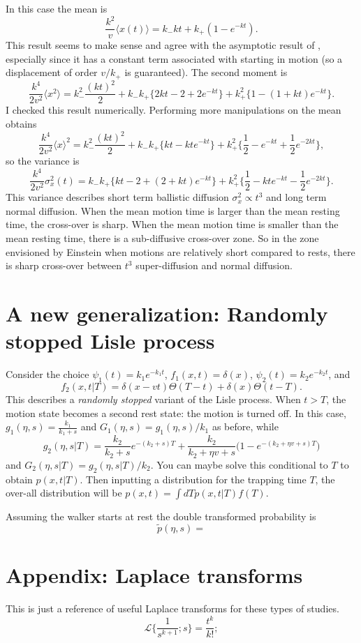\documentclass[11pt]{article}
\newcommand\be{\begin{equation}} %
\newcommand\ee{\end{equation}}   %
\newcommand\bra{\langle}
\newcommand\ket{\rangle}
\newcommand\El{\mathcal{L}}
\begin{document}
In this case the mean is
\be  \frac{k^2}{v}\bra x(t) \ket = k_- kt + k_+(1-e^{-kt}).\ee
This result seems to make sense and agree with the asymptotic result of \citet{Lisle1998}, especially since it has a constant term associated with starting in motion (so a displacement of order $v/k_+$ is guaranteed).
The second moment is
\be
\frac{k^4}{2v^2}\bra x^2 \ket = k_-^2\frac{(kt)^2}{2} + k_-k_+\{2kt -2 + 2e^{-kt}\} + k_+^2\{1-(1+kt)e^{-kt}\}.
\ee
I checked this result numerically.
Performing more manipulations on the mean obtains
\be\frac{k^4}{2v^2} \bra x\ket^2 = k_-^2 \frac{(kt)^2}{2} + k_-k_+\{kt - kte^{-kt}\} +  k_+^2\{\frac{1}{2} - e^{-kt} + \frac{1}{2}e^{-2kt}\}   ,\ee
so the variance is
\be \frac{k^4}{2v^2} \sigma_x^2(t) = k_- k_+ \{kt -2 + (2 + kt)e^{-kt}\} + k_+^2\{\frac{1}{2} -kt e^{-kt} - \frac{1}{2}e^{-2kt}\}.\ee
This variance describes short term ballistic diffusion $\sigma_x^2 \propto t^3$ and long term normal diffusion.
When the mean motion time is larger than the mean resting time, the cross-over is sharp.
When the mean motion time is smaller than the mean resting time,
there is a sub-diffusive cross-over zone.
So in the zone envisioned by Einstein when motions are relatively short compared to rests, there is sharp cross-over between $t^3$ super-diffusion and normal diffusion.
 
\section{A new generalization: Randomly stopped Lisle process}

Consider the choice $\psi_1(t) = k_1e^{-k_1t}$, $f_1(x,t)=\delta(x)$, $\psi_2(t) = k_2e^{-k_2t}$, and 
\be f_2(x,t|T) = \delta(x-vt)\Theta(T-t) + \delta(x)\Theta(t-T).\ee
This describes a \textit{randomly stopped} variant of the Lisle process.
When $t>T$, the motion state becomes a second rest state: the motion is turned off.
In this case, $g_1(\eta,s) = \frac{k_1}{k_1+s}$ and $G_1(\eta,s) = g_1(\eta,s)/k_1$ as before, while
\be g_2(\eta,s|T) = \frac{k_2}{k_2+s}e^{-(k_2+s)T} + \frac{k_2}{k_2 + \eta v + s}\Big(1-e^{-(k_2 + \eta v + s)T}\Big)\ee
and $G_2(\eta,s|T) = g_2(\eta,s|T)/k_2$.
You can maybe solve this conditional to $T$ to obtain $p(x,t|T)$.
Then inputting a distribution for the trapping time $T$, the over-all distribution will be $p(x,t) = \int dT p(x,t|T)f(T)$.

Assuming the walker starts at rest the double transformed probability is
\be \tilde{p}(\eta,s) = \ee


\section*{Appendix: Laplace transforms}
This is just a reference of useful Laplace transforms for these types of studies.
\be \El\Big\{\frac{1}{s^{k+1}};s\Big\} = \frac{t^k}{k!};\ee
\end{document}
